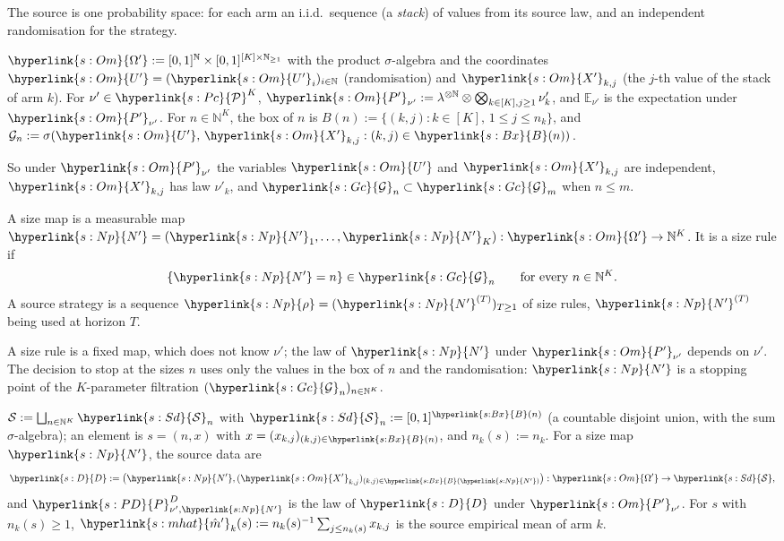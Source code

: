 \documentclass[11pt]{article}
\newcommand{\dt}[1]{\hypertarget{#1}{}}
\newcommand{\sy}[2]{\hyperlink{#1}{#2}}
\newcommand{\E}{\mathbb{E}}
\newcommand{\N}{\mathbb{N}}
\newcommand{\Pc}{\sy{s:Pc}{\mathcal{P}}}
\newcommand{\Sd}{\sy{s:Sd}{\mathcal{S}}}
\newcommand{\Gc}{\sy{s:Gc}{\mathcal{G}}}
\newcommand{\Bx}{\sy{s:Bx}{B}}
\newcommand{\Np}{\sy{s:Np}{N'}}
\newcommand{\rhos}{\sy{s:Np}{\rho}}
\newcommand{\Dd}{\sy{s:D}{D}}
\newcommand{\PD}{\sy{s:PD}{P}^{D}}
\newcommand{\Om}{\sy{s:Om}{\Omega'}}
\newcommand{\Up}{\sy{s:Om}{U'}}
\newcommand{\Xp}{\sy{s:Om}{X'}}
\newcommand{\mhat}{\sy{s:mhat}{\hat m'}}
\newcommand{\Pp}{\sy{s:Om}{P'}}
\begin{document}
The source is one probability space: for each arm an i.i.d.\ sequence (a \emph{stack}) of values
from its source law, and an independent randomisation for the strategy.

\begin{definition}\label{def:source-space}
\dt{s:Om}$\Om:=[0,1]^{\N}\times[0,1]^{[K]\times\N_{\ge1}}$ with the product $\sigma$-algebra and the
coordinates $\Up=(\Up_i)_{i\in\N}$ (randomisation) and $\Xp_{k,j}$ (the $j$-th value of the stack of
arm $k$). For $\nu'\in\Pc^K$, $\Pp_{\nu'}:=\lambda^{\otimes\N}\otimes\bigotimes_{k\in[K],j\ge1}\nu'_k$,
and $\E_{\nu'}$ is the expectation under $\Pp_{\nu'}$. For $n\in\N^K$, the box of $n$ is
\dt{s:Bx}$B(n):=\{(k,j):k\in[K],\,1\le j\le n_k\}$, and
\dt{s:Gc}$\mathcal G_n:=\sigma(\Up,\,\Xp_{k,j}:(k,j)\in\Bx(n))$.
\end{definition}

So under $\Pp_{\nu'}$ the variables $\Up$ and $\Xp_{k,j}$ are independent, $\Xp_{k,j}$ has law $\nu'_k$,
and $\Gc_n\subset\Gc_m$ when $n\le m$.

\begin{definition}\label{def:size-rule}
A size map is a measurable map\dt{s:Np} $\Np=(\Np_1,\dots,\Np_K):\Om\to\N^K$. It is a size rule if
\begin{equation*}
\{\Np=n\}\in\Gc_n\qquad\text{for every }n\in\N^K.
\end{equation*}
A source strategy is a sequence $\rhos=(\Np^{(T)})_{T\ge1}$ of size rules, $\Np^{(T)}$ being used at
horizon $T$.
\end{definition}

A size rule is a fixed map, which does not know $\nu'$; the law of $\Np$ under $\Pp_{\nu'}$ depends
on $\nu'$. The decision to stop at the sizes $n$ uses only the values in the box of $n$ and the
randomisation: $\Np$ is a stopping point of the $K$-parameter filtration $(\Gc_n)_{n\in\N^K}$.

\begin{definition}\label{def:source-data}
\dt{s:Sd}$\mathcal S:=\bigsqcup_{n\in\N^K}\Sd_n$ with $\Sd_n:=[0,1]^{\Bx(n)}$ (a countable disjoint
union, with the sum $\sigma$-algebra); an element is $s=(n,x)$ with $x=(x_{k,j})_{(k,j)\in\Bx(n)}$,
and $n_k(s):=n_k$. For a size map $\Np$, the source data are\dt{s:D}
\begin{equation*}
\Dd:=\big(\Np,(\Xp_{k,j})_{(k,j)\in\Bx(\Np)}\big):\Om\to\Sd,
\end{equation*}
and\dt{s:PD} $\PD_{\nu',\Np}$ is the law of $\Dd$ under $\Pp_{\nu'}$. For $s$ with $n_k(s)\ge1$,\dt{s:mhat}
$\mhat_k(s):=n_k(s)^{-1}\sum_{j\le n_k(s)}x_{k,j}$ is the source empirical mean of arm $k$.
\end{definition}
\end{document}
